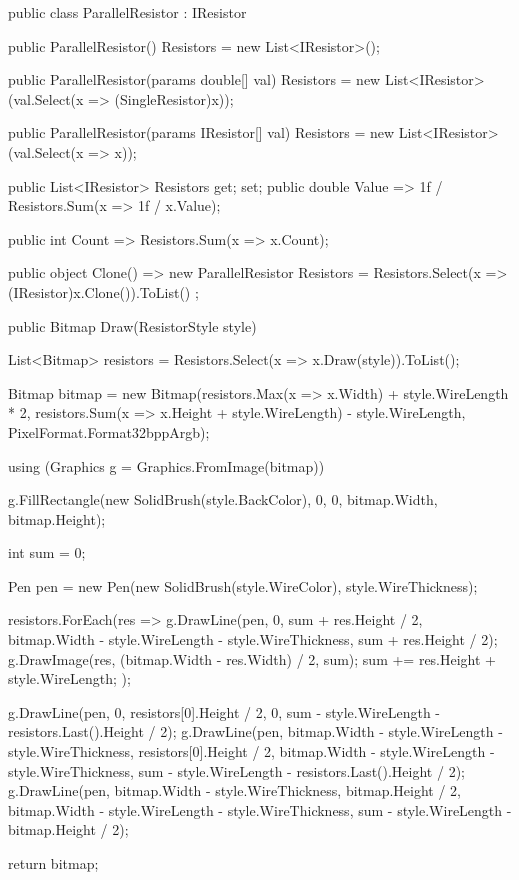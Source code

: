 \documentclass{article}
\begin{document}
\begin{Csharp}[caption=Klasse ParallelResistor,label=LIS:Par] 
public class ParallelResistor : IResistor
{
    public ParallelResistor()
    {
        Resistors = new List<IResistor>();
    }

    public ParallelResistor(params double[] val)
    {
        Resistors = new List<IResistor>(val.Select(x => (SingleResistor)x));
    }

    public ParallelResistor(params IResistor[] val)
    {
        Resistors = new List<IResistor>(val.Select(x => x));
    }

    public List<IResistor> Resistors { get; set; }
    public double Value => 1f / Resistors.Sum(x => 1f / x.Value);

    public int Count => Resistors.Sum(x => x.Count);

    public object Clone() => new ParallelResistor { Resistors = Resistors.Select(x => (IResistor)x.Clone()).ToList() };

    public Bitmap Draw(ResistorStyle style)
    {
        List<Bitmap> resistors = Resistors.Select(x => x.Draw(style)).ToList();

        Bitmap bitmap = new Bitmap(resistors.Max(x => x.Width) + style.WireLength * 2, resistors.Sum(x => x.Height + style.WireLength) - style.WireLength, PixelFormat.Format32bppArgb);

        using (Graphics g = Graphics.FromImage(bitmap))
        {
            g.FillRectangle(new SolidBrush(style.BackColor), 0, 0, bitmap.Width, bitmap.Height);

            int sum = 0;

            Pen pen = new Pen(new SolidBrush(style.WireColor), style.WireThickness);

            resistors.ForEach(res =>
            {
                g.DrawLine(pen, 0, sum + res.Height / 2, bitmap.Width - style.WireLength - style.WireThickness, sum + res.Height / 2);
                g.DrawImage(res, (bitmap.Width - res.Width) / 2, sum);
                sum += res.Height + style.WireLength;
            });

            g.DrawLine(pen, 0, resistors[0].Height / 2, 0, sum - style.WireLength - resistors.Last().Height / 2);
            g.DrawLine(pen, bitmap.Width - style.WireLength - style.WireThickness, resistors[0].Height / 2, bitmap.Width - style.WireLength - style.WireThickness, sum - style.WireLength - resistors.Last().Height / 2);
            g.DrawLine(pen, bitmap.Width - style.WireThickness, bitmap.Height / 2, bitmap.Width - style.WireLength - style.WireThickness, sum - style.WireLength - bitmap.Height / 2);
        }

        return bitmap;
    }
}
\end{Csharp}
\end{document}
